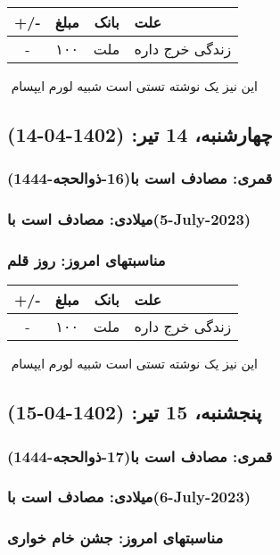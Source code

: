 \documentclass{article}
\newcommand{\rnote}[1]{\marginpar{\textcolor{color}{\StrSubstitute{\##1}{ }{\_}}}}
\newcommand{\myRow}[4]{
    #1 & #2 & #3 & #4 \\ \hline
}
\begin{document}
\begin{tabular}{ | c | c | c | p{5cm} |}
    \hline
    \myRow{ +/- }{مبلغ}{بانک}{علت}
    \myRow{-}{۱۰۰}{ملت}{زندگی خرج داره}
\end{tabular}
\newline
\newline

‌
\rnote{تست}
این نیز یک نوشته تستی است شبیه لورم ایپسام




\newpage
{}
\textcolor{color}{
\section{ چهارشنبه، 14 تیر: (1402-04-14) }
\subsubsection*{قمری: مصادف است با(16-ذوالحجه-1444)} 
\subsubsection*{میلادی: مصادف است با(5-July-2023)}
\subsubsection*{مناسبتهای امروز: روز قلم}
}


\begin{tabular}{ | c | c | c | p{5cm} |}
    \hline
    \myRow{ +/- }{مبلغ}{بانک}{علت}
    \myRow{-}{۱۰۰}{ملت}{زندگی خرج داره}
\end{tabular}
\newline
\newline

‌
\rnote{تست}
این نیز یک نوشته تستی است شبیه لورم ایپسام




\newpage
{}
\textcolor{color}{
\section{ پنجشنبه، 15 تیر: (1402-04-15) }
\subsubsection*{قمری: مصادف است با(17-ذوالحجه-1444)} 
\subsubsection*{میلادی: مصادف است با(6-July-2023)}
\subsubsection*{مناسبتهای امروز: جشن خام خواری}
}
\end{document}
